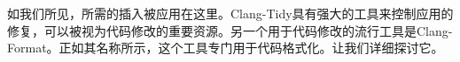 如我们所见，所需的插入被应用在这里。Clang-Tidy具有强大的工具来控制应用的修复，可以被视为代码修改的重要资源。另一个用于代码修改的流行工具是Clang-Format。正如其名称所示，这个工具专门用于代码格式化。让我们详细探讨它。



























































































